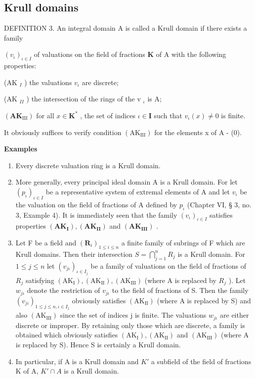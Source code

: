 \subsection{Krull domains}

DEFINITION 3. An integral domain A is called a Krull domain if there exists a family

\((v_{\iota})_{\iota\in I}\) of valuations on the field of fractions \(\mathbf{K}\) of A with the following properties:

(AK \(_{I}\) ) the valuations \(v_{\iota}\) are discrete;

(AK \(_{II}\) ) the intersection of the rings of the v \(_{\iota}\) is A;

\((\mathbf{A}\mathbf{K}_{\mathrm{III}})\) for all \(x \in \mathbf{K}^*\) , the set of indices \(\iota \in \mathbf{I}\) such that \(v_{\iota}(x) \neq 0\) is finite.

It obviously suffices to verify condition \((\mathrm{AK}_{\mathrm{III}})\) for the elements x of A - (0).

\textbf{Examples}\par

\begin{enumerate}
\def\labelenumi{(\arabic{enumi})}
\item
  Every discrete valuation ring is a Krull domain.
\item
  More generally, every principal ideal domain A is a Krull domain. For let \((p_{\iota})_{\iota\in I}\) be a representative system of extremal elements of A and let \(v_{\iota}\) be the valuation on the field of fractions of A defined by \(p_{\iota}\) (Chapter VI, § 3, no. 3, Example 4). It is immediately seen that the family \((v_{\iota})_{\iota\in I}\) satisfies properties \((\mathbf{AK}_{\mathbf{I}}), (\mathbf{AK}_{\mathbf{II}})\) and \((\mathbf{AK}_{\mathbf{III}})\) .
\item
  Let F be a field and \((\mathbf{R}_{i})_{1\leqslant i\leqslant n}\) a finite family of subrings of F which are Krull domains. Then their intersection \(S=\bigcap_{j=1}^{n}R_{j}\) is a Krull domain. For \(1\leqslant j\leqslant n\) let \((v_{j\iota})_{\iota\in I_j}\) be a family of valuations on the field of fractions of \(R_{j}\) satisfying \((\mathrm{AK}_{\mathrm{I}}),(\mathrm{AK}_{\mathrm{II}}),(\mathrm{AK}_{\mathrm{III}})\) (where A is replaced by \(R_{j}\) ). Let \(w_{j\iota}\) denote the restriction of \(v_{j\iota}\) to the field of fractions of S. Then the family \((v_{j\iota})_{1\leqslant j\leqslant n,\iota\in I_j}\) obviously satisfies \((\mathrm{AK}_{\mathrm{II}})\) (where A is replaced by S) and also \((\mathrm{AK}_{\mathrm{III}})\) since the set of indices j is finite. The valuations \(w_{j\iota}\) are either discrete or improper. By retaining only those which are discrete, a family is obtained which obviously satisfies \((\mathrm{AK}_{\mathrm{I}}),(\mathrm{AK}_{\mathrm{II}})\) and \((\mathrm{AK}_{\mathrm{III}})\) (where A is replaced by S). Hence S is certainly a Krull domain.
\item
  In particular, if A is a Krull domain and \(K'\) a subfield of the field of fractions K of A, \(K' \cap A\) is a Krull domain.
\end{enumerate}

